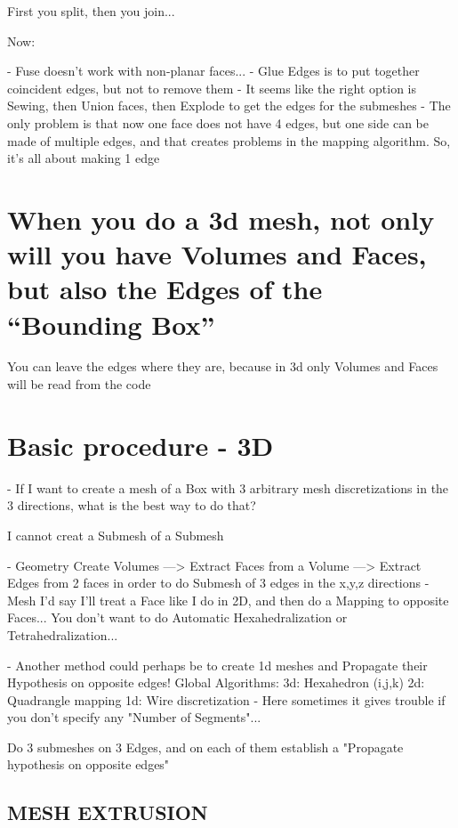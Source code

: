 \documentclass[10pt]{book}
\begin{document}
 First you split, then you join...
 
 Now:
 
 - Fuse doesn't work with non-planar faces...
 - Glue Edges is to put together coincident edges, but not to remove them
 - It seems like the right option is Sewing, then Union faces, then Explode to get the edges for the submeshes
 - The only problem is that now one face does not have 4 edges, but one side can be made of multiple edges,
   and that creates problems in the mapping algorithm. So, it's all about making 1 edge
   
\section{When you do a 3d mesh, not only will you have Volumes and Faces, but also the Edges of the ``Bounding Box''}

  You can leave the edges where they are, because in 3d only Volumes and Faces will be read from the code
 

\section{Basic procedure - 3D}


- If I want to create a mesh of a Box with 3 arbitrary mesh discretizations in the 3 directions,
  what is the best way to do that?
  

I cannot creat a Submesh of a Submesh

- Geometry
  Create Volumes
    ---> Extract Faces from a Volume
    ---> Extract Edges from 2 faces in order to do Submesh of 3 edges in the x,y,z directions
- Mesh 
  I'd say I'll treat a Face like I do in 2D, and then do a Mapping to opposite Faces...
  You don't want to do Automatic Hexahedralization or Tetrahedralization...
  
- Another method could perhaps be to create 1d meshes and Propagate their Hypothesis on opposite edges!
  Global Algorithms:
    3d: Hexahedron (i,j,k)
    2d: Quadrangle mapping
    1d: Wire discretization  - Here sometimes it gives trouble if you don't specify any "Number of Segments"...
    
    Do 3 submeshes on 3 Edges, and on each of them establish a "Propagate hypothesis on opposite edges"
    

    
\subsection{MESH EXTRUSION}
\end{document}
